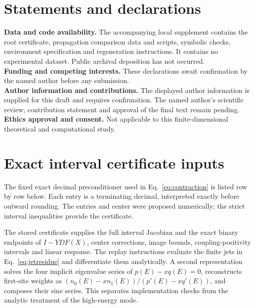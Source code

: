 \documentclass[11pt,a4paper]{article}
\numberwithin{equation}{section}
\begin{document}
\section*{Statements and declarations}
\noindent\textbf{Data and code availability.}
The accompanying local supplement contains the root certificate,
propagation comparison data and scripts, symbolic checks, environment
specification and regeneration instructions. It contains no experimental
dataset. Public archival deposition has not occurred.\\[3pt]
\textbf{Funding and competing interests.}
These declarations await confirmation by the named author before any
submission.\\[3pt]
\textbf{Author information and contributions.}
The displayed author information is supplied for this draft and requires
confirmation. The named author's scientific review, contribution statement
and approval of the final text remain pending.\\[3pt]
\textbf{Ethics approval and consent.}
Not applicable to this finite-dimensional theoretical and computational study.

\appendix
\section{Exact interval certificate inputs}\label{app:certificate}
The fixed exact decimal preconditioner used in Eq.~\eqref{eq:contraction}
is listed row by row below. Each entry is a terminating decimal, interpreted
exactly before outward rounding. The entries and center were proposed
numerically; the strict interval inequalities provide the certificate.

The stored certificate supplies the full interval Jacobian and the exact
binary endpoints of $I-YDF(X)$, center corrections, image bounds,
coupling-positivity intervals and linear response. The replay instructions
evaluate the finite jets in Eq.~\eqref{eq:jetresidue} and differentiate
them analytically. A second representation solves the four implicit
eigenvalue series of $p(E)-xq(E)=0$, reconstructs first-site weights as
$(n_0(E)-xn_1(E))/(p'(E)-xq'(E))$, and composes their sine series.
This separates implementation checks from the analytic treatment of the
high-energy mode.



\end{document}
